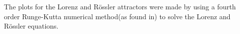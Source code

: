 \documentclass[paper=a4, fontsize=11pt, abstract=on]{scrartcl} %
\numberwithin{equation}{section}
\numberwithin{figure}{section}
\numberwithin{table}{section}
\begin{document}
The plots for the Lorenz and R\"{o}ssler attractors were made by using
a fourth order Runge-Kutta numerical method(as found in\cite{numerical}) to solve the
Lorenz and R\"{o}ssler equations. 





%

%

%




\end{document}
